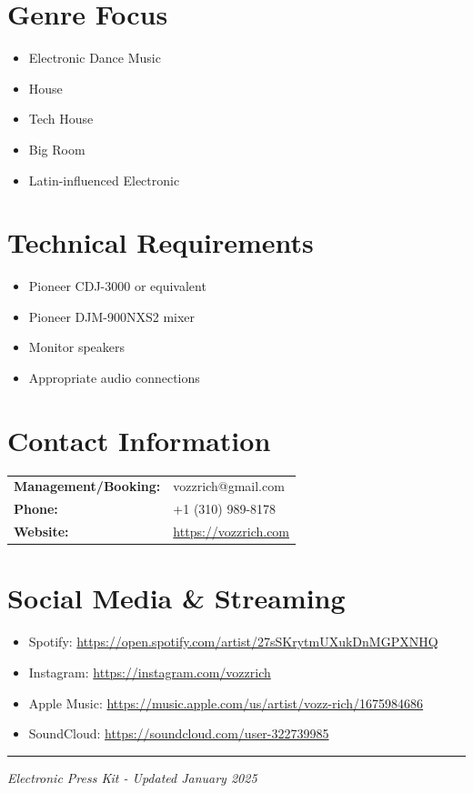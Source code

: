 \documentclass[11pt]{article}
\begin{document}
\section*{Genre Focus}
\begin{itemize}
\item Electronic Dance Music
\item House
\item Tech House
\item Big Room
\item Latin-influenced Electronic
\end{itemize}

\section*{Technical Requirements}
\begin{itemize}
\item Pioneer CDJ-3000 or equivalent
\item Pioneer DJM-900NXS2 mixer
\item Monitor speakers
\item Appropriate audio connections
\end{itemize}

\section*{Contact Information}
\begin{tabular}{ll}
\textbf{Management/Booking:} & vozzrich@gmail.com\\
\textbf{Phone:} & +1 (310) 989-8178\\
\textbf{Website:} & \url{https://vozzrich.com}
\end{tabular}

\section*{Social Media \& Streaming}
\begin{itemize}
\item Spotify: \url{https://open.spotify.com/artist/27sSKrytmUXukDnMGPXNHQ}
\item Instagram: \url{https://instagram.com/vozzrich}
\item Apple Music: \url{https://music.apple.com/us/artist/vozz-rich/1675984686}
\item SoundCloud: \url{https://soundcloud.com/user-322739985}
\end{itemize}

\vspace{0.5cm}
\begin{center}
\rule{\textwidth}{1pt}
\textit{Electronic Press Kit - Updated January 2025}
\end{center}
\end{document}
